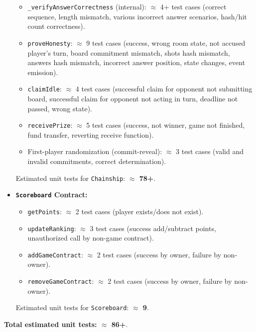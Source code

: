\documentclass{article}
\begin{document}
\begin{itemize}
\begin{itemize}
            \item \texttt{\_verifyAnswerCorrectness} (internal): \(\approx\) 4+ test cases (correct sequence, length mismatch, various incorrect answer scenarios, hash/hit count correctness).
            \item \texttt{proveHonesty}: \(\approx\) 9 test cases (success, wrong room state, not accused player's turn, board commitment mismatch, shots hash mismatch, answers hash mismatch, incorrect answer position, state changes, event emission).
            \item \texttt{claimIdle}: \(\approx\) 4 test cases (successful claim for opponent not submitting board, successful claim for opponent not acting in turn, deadline not passed, wrong state).
            \item \texttt{receivePrize}: \(\approx\) 5 test cases (success, not winner, game not finished, fund transfer, reverting receive function).
            \item First-player randomization (commit-reveal): \(\approx\) 3 test cases (valid and invalid commitments, correct determination).
        \end{itemize}
        Estimated unit tests for \texttt{Chainship}: \textbf{\(\approx\) 78+}.

        \item \textbf{\texttt{Scoreboard} Contract:}
        \begin{itemize}
            \item \texttt{getPoints}: \(\approx\) 2 test cases (player exists/does not exist).
            \item \texttt{updateRanking}: \(\approx\) 3 test cases (success add/subtract points, unauthorized call by non-game contract).
            \item \texttt{addGameContract}: \(\approx\) 2 test cases (success by owner, failure by non-owner).
            \item \texttt{removeGameContract}: \(\approx\) 2 test cases (success by owner, failure by non-owner).
        \end{itemize}
        Estimated unit tests for \texttt{Scoreboard}: \textbf{\(\approx\) 9}.
    \end{itemize}
    \textbf{Total estimated unit tests: \(\approx\) 86+}.
\end{document}
